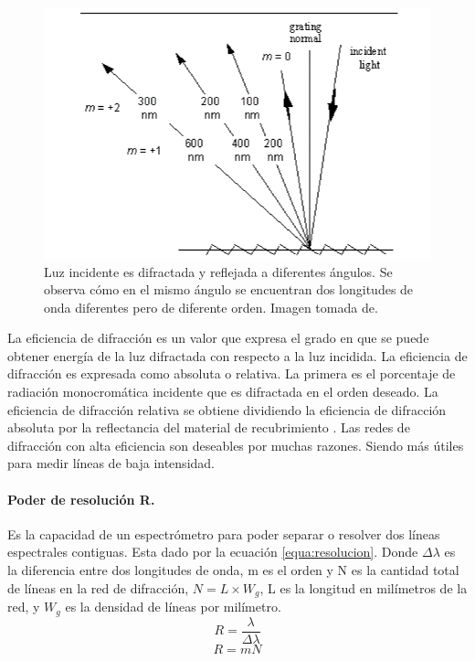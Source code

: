 \begin{figure}[h]
	\centering
	\includegraphics[width=0.7\linewidth]{Imagenes/2/ordenes}
	\caption[Difracción de la luz se aprecia el orden de difracción de diferentes longitudes de onda.]{Luz incidente es difractada y reflejada a diferentes ángulos. Se observa cómo en el mismo ángulo se encuentran dos longitudes de onda diferentes pero de diferente orden. Imagen tomada de. \cite{Palmer2005}}
	\label{fig:ordenes}
\end{figure}


La eficiencia de difracción es un valor que expresa el grado en que se puede obtener energía de la luz difractada con respecto a la luz incidida.
La eficiencia de difracción es expresada como absoluta o relativa. La primera es el porcentaje de radiación monocromática incidente que es difractada en el orden deseado. La eficiencia de difracción relativa se obtiene dividiendo la eficiencia de difracción absoluta por la reflectancia del material de recubrimiento \cite{Shimadzu}.
Las redes de difracción con alta eficiencia son deseables por muchas razones. Siendo más útiles para medir líneas de baja intensidad. \cite{Palmer2005}

\paragraph{Poder de resolución R.} 
Es la capacidad de un espectrómetro para poder separar o resolver dos líneas espectrales contiguas. Esta dado por la ecuación \ref{equa:resolucion}. Donde $\Delta\lambda$ es la diferencia entre dos longitudes de onda, m es el orden y N es la cantidad total de líneas en la red de difracción, $N= L\times W_g$, L es la longitud en milímetros de la red, y $W_g$ es la densidad de líneas por milímetro.
\begin{equation}
	R = \frac{\lambda}{\Delta \lambda}
	\label{equa:resolucion}
\end{equation}
\begin{equation}
	R = mN
	\label{equa:resolucion2}
\end{equation}

